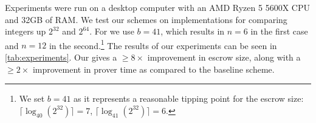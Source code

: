 Experiments were run on a desktop computer with an AMD Ryzen 5 5600X CPU and 32GB of RAM.
We test our schemes on implementations for comparing integers up $2^{32}$ and $2^{64}$. For \schemename{} we use $b = 41$, which results in $n = 6$ in the first case and $n = 12$ in the second.\footnote{We set $b = 41$ as it represents a reasonable tipping point for the escrow size: $\lceil \log_{40}(2^{32}) \rceil = 7$, $\lceil \log_{41}(2^{32}) \rceil = 6$.}
The results of our experiments can be seen in \cref{tab:experiments}.
Our \schemename{} gives a $\geq 8 \times$ improvement in escrow size, along with a $\geq 2 \times$ improvement in prover time as compared to the baseline scheme.

